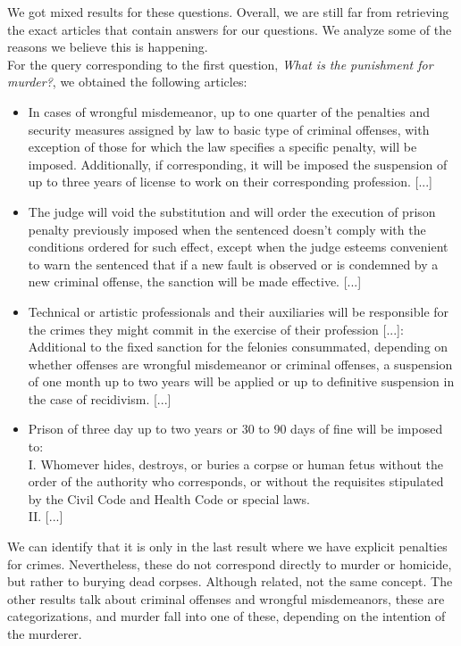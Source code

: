 \documentclass[letterpaper, margin=1in]{article}
\begin{document}
We got mixed results for these questions. Overall, we are still far from retrieving the exact articles that contain answers for our questions. We analyze some of the reasons we believe this is happening. \\

For the query corresponding to the first question, \textit{What is the punishment for murder?}, we obtained the following articles:
\begin{itemize}
\item In cases of wrongful misdemeanor, up to one quarter of the penalties and security measures assigned by law to basic type of criminal offenses, with exception of those for which the law specifies a specific penalty, will be imposed. Additionally, if corresponding, it will be imposed the suspension of up to three years of license to work on their corresponding profession. [...]
\item The judge will void the substitution and will order the execution of prison penalty previously imposed when the sentenced doesn't comply with the conditions ordered for such effect, except when the judge esteems convenient to warn the sentenced that if a new fault is observed or is condemned by a new criminal offense, the sanction will be made effective. [...]
\item Technical or artistic professionals and their auxiliaries will be responsible for the crimes they might commit in the exercise of their profession [...]: \\
Additional to the fixed sanction for the felonies consummated, depending on whether offenses are wrongful misdemeanor or criminal offenses, a suspension of one month up to two years will be applied or up to definitive suspension in the case of recidivism. [...]
\item Prison of three day up to two years or 30 to 90 days of fine will be imposed to: \\
I. Whomever hides, destroys, or buries a corpse or human fetus without the order of the authority who corresponds, or without the requisites stipulated by the Civil Code and Health Code or special laws. \\
II. [...]
\end{itemize}

We can identify that it is only in the last result where we have explicit penalties for crimes. Nevertheless, these do not correspond directly to murder or homicide, but rather to burying dead corpses. Although related, not the same concept. The other results talk about criminal offenses and wrongful misdemeanors, these are categorizations, and murder fall into one of these, depending on the intention of the murderer. 
\end{document}
